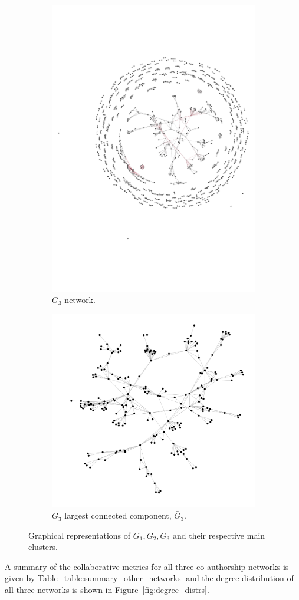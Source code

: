 \documentclass{article}
\theoremstyle{definition}
\begin{document}
\begin{figure}[!hbtp]
    \begin{subfigure}{.45\textwidth}\centering
        \includegraphics[width=.54\textwidth]{./assets/images/anarchy_network.pdf}
        \caption{\(G_3\) network.}\label{fig:g_three}
     \end{subfigure}
     \begin{subfigure}{.45\textwidth}\centering
        \includegraphics[width=.54\textwidth]{./assets/images/anarchy_network_cluster.pdf}
        \caption{\(G_3\) largest connected component,  \(\bar{G}_{3}\).}\label{fig:g_three_cluster}
     \end{subfigure}
     \caption{Graphical representations of \(G_1, G_2, G_3\) and their respective
     main clusters.}
\end{figure}

A summary of the collaborative metrics for all three co authorship networks is given by
Table~\ref{table:summary_other_networks} and the degree distribution of all three
networks is shown in Figure~\ref{fig:degree_distrs}.
\end{document}
